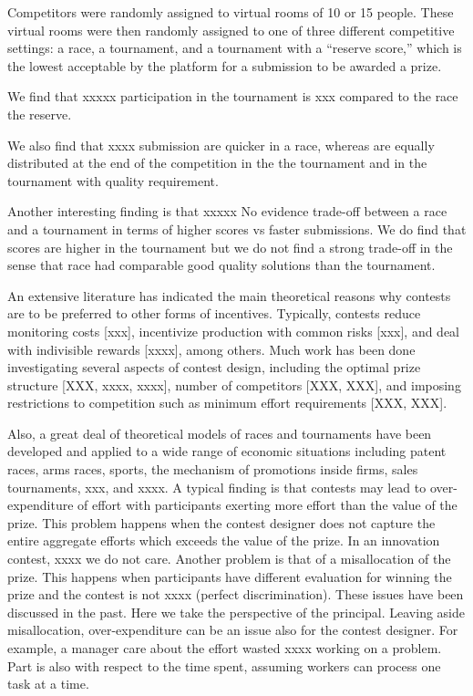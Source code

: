 \documentclass[12pt,]{article}
\begin{document}
Competitors were randomly assigned to virtual rooms of 10 or 15 people.
These virtual rooms were then randomly assigned to one of three
different competitive settings: a race, a tournament, and a tournament
with a ``reserve score,'' which is the lowest acceptable by the platform
for a submission to be awarded a prize.

We find that xxxxx participation in the tournament is xxx compared to
the race the reserve.

We also find that xxxx submission are quicker in a race, whereas are
equally distributed at the end of the competition in the the tournament
and in the tournament with quality requirement.

Another interesting finding is that xxxxx No evidence trade-off between
a race and a tournament in terms of higher scores vs faster submissions.
We do find that scores are higher in the tournament but we do not find a
strong trade-off in the sense that race had comparable good quality
solutions than the tournament.

An extensive literature has indicated the main theoretical reasons why
contests are to be preferred to other forms of incentives. Typically,
contests reduce monitoring costs {[}xxx{]}, incentivize production with
common risks {[}xxx{]}, and deal with indivisible rewards {[}xxxx{]},
among others. Much work has been done investigating several aspects of
contest design, including the optimal prize structure {[}XXX, xxxx,
xxxx{]}, number of competitors {[}XXX, XXX{]}, and imposing restrictions
to competition such as minimum effort requirements {[}XXX, XXX{]}.

Also, a great deal of theoretical models of races and tournaments have
been developed and applied to a wide range of economic situations
including patent races, arms races, sports, the mechanism of promotions
inside firms, sales tournaments, xxx, and xxxx. A typical finding is
that contests may lead to over-expenditure of effort with participants
exerting more effort than the value of the prize. This problem happens
when the contest designer does not capture the entire aggregate efforts
which exceeds the value of the prize. In an innovation contest, xxxx we
do not care. Another problem is that of a misallocation of the prize.
This happens when participants have different evaluation for winning the
prize and the contest is not xxxx (perfect discrimination). These issues
have been discussed in the past. Here we take the perspective of the
principal. Leaving aside misallocation, over-expenditure can be an issue
also for the contest designer. For example, a manager care about the
effort wasted xxxx working on a problem. Part is also with respect to
the time spent, assuming workers can process one task at a time.
\end{document}
